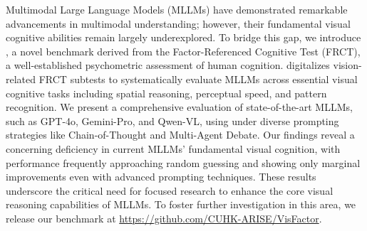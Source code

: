 Multimodal Large Language Models (MLLMs) have demonstrated remarkable advancements in multimodal understanding; however, their fundamental visual cognitive abilities remain largely underexplored.
To bridge this gap, we introduce {\methodname}, a novel benchmark derived from the Factor-Referenced Cognitive Test (FRCT), a well-established psychometric assessment of human cognition.
{\methodname} digitalizes vision-related FRCT subtests to systematically evaluate MLLMs across essential visual cognitive tasks including spatial reasoning, perceptual speed, and pattern recognition.
We present a comprehensive evaluation of state-of-the-art MLLMs, such as GPT-4o, Gemini-Pro, and Qwen-VL, using {\methodname} under diverse prompting strategies like Chain-of-Thought and Multi-Agent Debate.
Our findings reveal a concerning deficiency in current MLLMs' fundamental visual cognition, with performance frequently approaching random guessing and showing only marginal improvements even with advanced prompting techniques.
These results underscore the critical need for focused research to enhance the core visual reasoning capabilities of MLLMs.
To foster further investigation in this area, we release our {\methodname} benchmark at \url{https://github.com/CUHK-ARISE/VisFactor}.